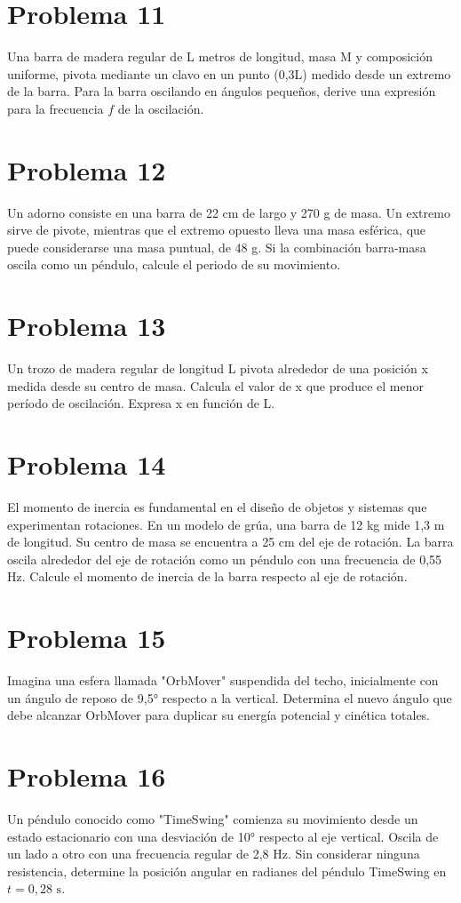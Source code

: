 \documentclass[10pt,a4paper]{article}
\begin{document}
\section*{Problema 11}
Una barra de madera regular de L metros de longitud, masa M y composición uniforme, pivota mediante un clavo en un punto (0,3L) medido desde un extremo de la barra. Para la barra oscilando en ángulos pequeños, derive una expresión para la frecuencia $f$ de la oscilación.
\vspace{6cm}
\section*{Problema 12}
Un adorno consiste en una barra de 22 cm de largo y 270 g de masa. Un extremo sirve de pivote, mientras que el extremo opuesto lleva una masa esférica, que puede considerarse una masa puntual, de 48 g. Si la combinación barra-masa oscila como un péndulo, calcule el periodo de su movimiento.
\vspace{6cm}
\section*{Problema 13}
Un trozo de madera regular de longitud L pivota alrededor de una posición x medida desde su centro de masa. Calcula el valor de x que produce el menor período de oscilación. Expresa x en función de L.
\vspace{6cm}
\section*{Problema 14}
El momento de inercia es fundamental en el diseño de objetos y sistemas que experimentan rotaciones. En un modelo de grúa, una barra de 12 kg mide 1,3 m de longitud. Su centro de masa se encuentra a 25 cm del eje de rotación. La barra oscila alrededor del eje de rotación como un péndulo con una frecuencia de 0,55 Hz. Calcule el momento de inercia de la barra respecto al eje de rotación.
\vspace{6cm}
\section*{Problema 15}
Imagina una esfera llamada "OrbMover" suspendida del techo, inicialmente con un ángulo de reposo de 9,5° respecto a la vertical. Determina el nuevo ángulo que debe alcanzar OrbMover para duplicar su energía potencial y cinética totales.
\vspace{6cm}
\section*{Problema 16}
Un péndulo conocido como "TimeSwing" comienza su movimiento desde un estado estacionario con una desviación de 10° respecto al eje vertical. Oscila de un lado a otro con una frecuencia regular de 2,8 Hz. Sin considerar ninguna resistencia, determine la posición angular en radianes del péndulo TimeSwing en $t = 0,28 \text{ s}$.
\vspace{6cm}
\end{document}
